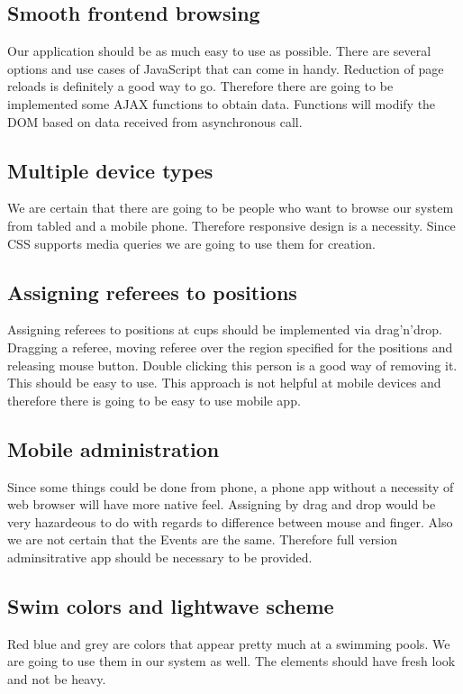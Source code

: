 \subsection*{Smooth frontend browsing}
\par
Our application should be as much easy to use as possible. There are several options and use cases of JavaScript that can come in handy. Reduction of page reloads is definitely a good way to go. Therefore there are going to be implemented some AJAX functions to obtain data. Functions will modify the DOM based on data received from asynchronous call. 
\subsection*{Multiple device types}
\par
We are certain that there are going to be people who want to browse our system from tabled and a mobile phone. Therefore responsive design is a necessity. Since CSS supports media queries  we are going to use them for creation.
\subsection*{Assigning referees to positions}
\par
Assigning referees to positions at cups should be implemented via drag'n'drop. Dragging a referee, moving referee over the region specified for the positions and releasing mouse button. Double clicking this person is a good way of removing it. This should be easy to use. This approach is not helpful at mobile devices and therefore there is going to be easy to use mobile app.
\subsection*{Mobile administration}
Since some things could be done from phone, a phone app without a necessity of web browser will have more native feel. Assigning by drag and drop would be very hazardeous to do with regards to difference between mouse and finger. Also we are not certain that the Events are the same. Therefore full version adminsitrative app should be necessary to be provided.
\subsection*{Swim colors and lightwave scheme}
\par
Red blue and grey are colors that appear pretty much at a swimming pools. We are going to use them in our system as well. The elements should have fresh look and not be heavy.
